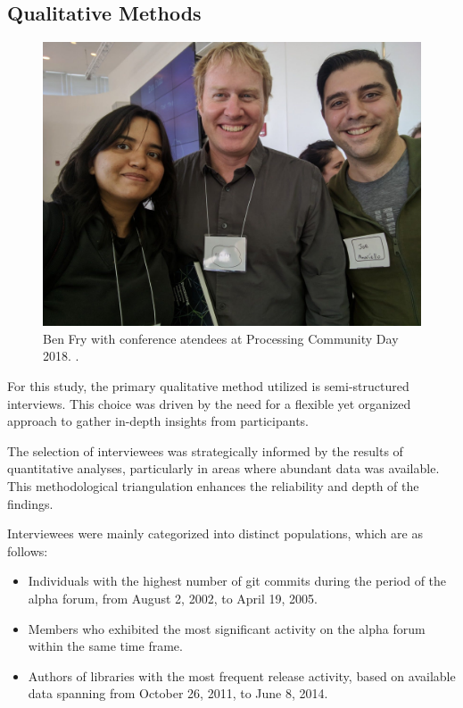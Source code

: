 \documentclass{article}
\begin{document}

\subsection{Qualitative Methods}
\begin{figure}[H]
  \begin{minipage}{\textwidth}
    \includegraphics[width=\linewidth]{images/pcd2018.jpg}
    \caption[Ben Fry at PCD 2018]{Ben Fry with conference atendees at Processing Community Day 2018. .}
    \label{fig:benFry}
    
  \end{minipage}
\end{figure}

For this study, the primary qualitative method utilized is semi-structured interviews. This choice was driven by the need for a flexible yet organized approach to gather in-depth insights from participants.

The selection of interviewees was strategically informed by the results of quantitative analyses, particularly in areas where abundant data was available. This methodological triangulation enhances the reliability and depth of the findings.

Interviewees were mainly categorized into distinct populations, which are as follows:

\begin{itemize}
    \item Individuals with the highest number of git commits during the period of the alpha forum, from August 2, 2002, to April 19, 2005.
    \item Members who exhibited the most significant activity on the alpha forum within the same time frame.
    \item Authors of libraries with the most frequent release activity, based on available data spanning from October 26, 2011, to June 8, 2014.
\end{itemize}
\end{document}
